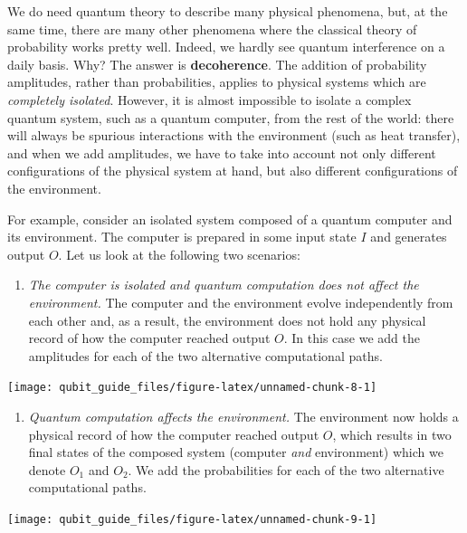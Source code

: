 \documentclass[fleqn,a4paper]{article}
\providecommand{\tightlist}{\setlength{\itemsep}{0pt}\setlength{\parskip}{0pt}}
\theoremstyle{definition}
\theoremstyle{definition}
\theoremstyle{definition}
\theoremstyle{definition}
\theoremstyle{remark}
\begin{document}
We do need quantum theory to describe many physical phenomena, but, at the same time, there are many other phenomena where the classical theory of probability works pretty well.
Indeed, we hardly see quantum interference on a daily basis.
Why?
The answer is \textbf{decoherence}.
The addition of probability amplitudes, rather than probabilities, applies to physical systems which are \emph{completely isolated}.
However, it is almost impossible to isolate a complex quantum system, such as a quantum computer, from the rest of the world: there will always be spurious interactions with the environment (such as heat transfer), and when we add amplitudes, we have to take into account not only different configurations of the physical system at hand, but also different configurations of the environment.

For example, consider an isolated system composed of a quantum computer and its environment.
The computer is prepared in some input state \(I\) and generates output \(O\).
Let us look at the following two scenarios:

\begin{enumerate}
\def\labelenumi{\arabic{enumi}.}
\tightlist
\item
  \emph{The computer is isolated and quantum computation does not affect the environment.}
  The computer and the environment evolve independently from each other and, as a result, the environment does not hold any physical record of how the computer reached output \(O\).
  In this case we add the amplitudes for each of the two alternative computational paths.
\end{enumerate}

\begin{center}\texttt{[image: qubit\_guide\_files/figure-latex/unnamed-chunk-8-1]} \end{center}

\begin{enumerate}
\def\labelenumi{\arabic{enumi}.}
\setcounter{enumi}{1}
\tightlist
\item
  \emph{Quantum computation affects the environment.}
  The environment now holds a physical record of how the computer reached output \(O\), which results in two final states of the composed system (computer \emph{and} environment) which we denote \(O_1\) and \(O_2\).
  We add the probabilities for each of the two alternative computational paths.
\end{enumerate}

\begin{center}\texttt{[image: qubit\_guide\_files/figure-latex/unnamed-chunk-9-1]} \end{center}
\end{document}
